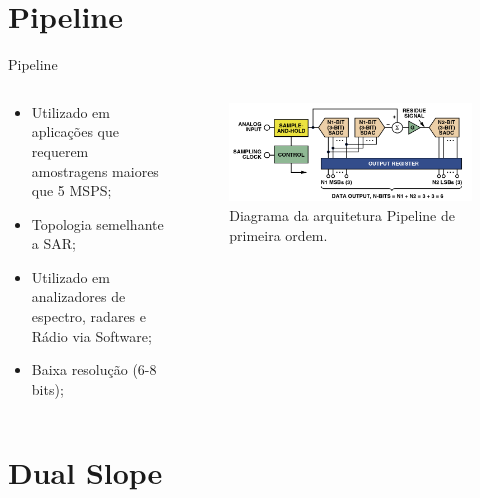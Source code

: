 \documentclass{beamer}
\begin{document}
\section{Pipeline}

\begin{frame}{Pipeline}
\begin{columns}
    \begin{column}{0.50\textwidth}
		\begin{itemize}
			\item Utilizado em aplicações que requerem amostragens maiores que 5 MSPS;
			\item Topologia semelhante a SAR;
			\item Utilizado em analizadores de espectro, radares e Rádio via Software;
			\item Baixa resolução (6-8 bits);
		\end{itemize}
    \end{column}

    \begin{column}{0.5\textwidth}
		\begin{figure}[H]
		    \centering
		    \begin{center}
		    \includegraphics[width=\textwidth]{img/pipeline}
		  \caption{Diagrama da arquitetura Pipeline de primeira ordem.}
		    \label{fig:sar}
		  \end{center}
		\end{figure}
    \end{column}
\end{columns}

\end{frame}


\section{Dual Slope}
\end{document}
